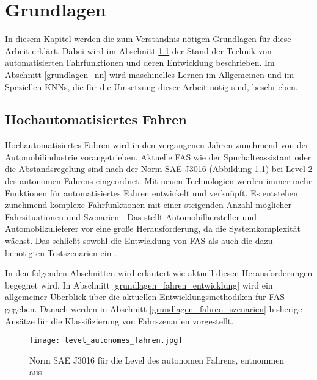 
\chapter{Grundlagen}
\label{grundlagen}

In diesem Kapitel werden die zum Verständnis nötigen Grundlagen für diese Arbeit erklärt. Dabei wird im Abschnitt \ref{grundlagen_fahren} der Stand der Technik von automatisierten Fahrfunktionen und deren Entwicklung beschrieben. Im Abschnitt \ref{grundlagen_nn} wird maschinelles Lernen im Allgemeinen und im Speziellen \acp{KNN}, die für die Umsetzung dieser Arbeit nötig sind, beschrieben.


\section{Hochautomatisiertes Fahren}
\label{grundlagen_fahren}

Hochautomatisiertes Fahren wird in den vergangenen Jahren zunehmend von der Automobilindustrie vorangetrieben. Aktuelle \ac{FAS} wie der Spurhalteassistant oder die Abstandsregelung sind nach der Norm SAE J3016 (Abbildung \ref{fig_level_autonomes_fahren}) bei Level 2 des autonomen Fahrens eingeordnet. Mit neuen Technologien werden immer mehr Funktionen für automatisiertes Fahren entwickelt und verknüpft. Es entstehen zunehmend komplexe Fahrfunktionen mit einer steigenden Anzahl möglicher Fahrsituationen und Szenarien \cite{king2017identification}.  Das stellt Automobilhersteller und Automobilzulieferer vor eine große Herausforderung, da die Systemkomplexität wächst. Das schließt sowohl die Entwicklung von \ac{FAS} als auch die dazu benötigten Testszenarien ein \cite{pfeffer2016continuous}.

In den folgenden Abschnitten wird erläutert wie aktuell diesen Herausforderungen begegnet wird. In Abschnitt \ref{grundlagen_fahren_entwicklung} wird ein allgemeiner Überblick über die aktuellen Entwicklungsmethodiken für \ac{FAS} gegeben. Danach werden in Abschnitt \ref{grundlagen_fahren_szenarien} bisherige Ansätze für die Klassifizierung von Fahrszenarien vorgestellt.

\begin{figure}[h]
\centering
\texttt{[image: level\_autonomes\_fahren.jpg]}
\caption{Norm SAE J3016 für die Level des autonomen Fahrens, entnommen aus \cite{sae2014taxonomy}}
\label{fig_level_autonomes_fahren}
\end{figure}


